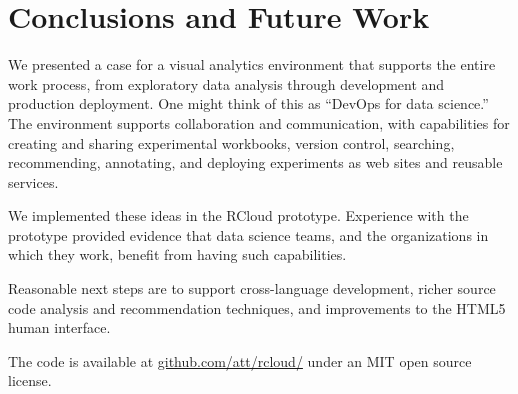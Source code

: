 \section{Conclusions and Future Work}

We presented a case for a visual analytics environment that supports
the entire work process, from exploratory data analysis
through development and production deployment. One might think of
this as ``DevOps for data science.'' The environment supports
collaboration and communication, with capabilities for
creating and sharing experimental workbooks, version control,
searching, recommending, annotating, and deploying experiments
as web sites and reusable services.

We implemented these ideas in the RCloud prototype.
Experience with the prototype provided evidence that data
science teams, and the organizations in which they work,
benefit from having such capabilities.

Reasonable next steps are to support cross-language development,
richer source code analysis and recommendation techniques, and
improvements to the HTML5 human interface.

The code is available 
at \url{github.com/att/rcloud/}
under an MIT open source license.
